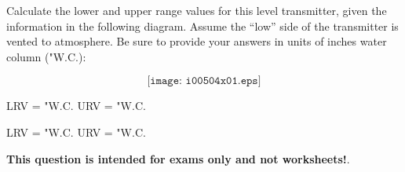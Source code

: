 

Calculate the lower and upper range values for this level transmitter, given the information in the following diagram.  Assume the ``low'' side of the transmitter is vented to atmosphere.  Be sure to provide your answers in units of inches water column ("W.C.):

$$\texttt{[image: i00504x01.eps]}$$

LRV = \underbar{\hskip 50pt} "W.C. \hskip 100pt URV = \underbar{\hskip 50pt} "W.C.







LRV =  "W.C. \hskip 100pt URV =  "W.C.







{\bf This question is intended for exams only and not worksheets!}.



